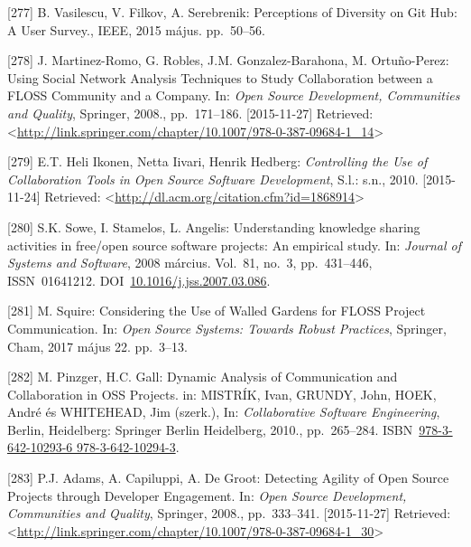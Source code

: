 \documentclass[12pt,magyar,a4paper,oneside]{scrreprt}
\begin{document}
\leavevmode\hypertarget{ref-vasilescu_perceptions_2015}{}%
{[}277{]} B. Vasilescu, V. Filkov, A. Serebrenik: Perceptions of
Diversity on Git Hub: A User Survey., IEEE, 2015 május. pp.~50--56.

\leavevmode\hypertarget{ref-martinez-romo_using_2008}{}%
{[}278{]} J. Martinez-Romo, G. Robles, J.M. Gonzalez-Barahona, M.
Ortuño-Perez: Using Social Network Analysis Techniques to Study
Collaboration between a FLOSS Community and a Company. In: \emph{Open
Source Development, Communities and Quality}, Springer, 2008.,
pp.~171--186. {[}2015-11-27{]} Retrieved:
\textless{}\url{http://link.springer.com/chapter/10.1007/978-0-387-09684-1_14}\textgreater{}

\leavevmode\hypertarget{ref-heli_ikonen_controlling_2010}{}%
{[}279{]} E.T. Heli Ikonen, Netta Iivari, Henrik Hedberg:
\emph{Controlling the Use of Collaboration Tools in Open Source Software
Development}, S.l.: s.n., 2010. {[}2015-11-24{]} Retrieved:
\textless{}\url{http://dl.acm.org/citation.cfm?id=1868914}\textgreater{}

\leavevmode\hypertarget{ref-sowe_understanding_2008}{}%
{[}280{]} S.K. Sowe, I. Stamelos, L. Angelis: Understanding knowledge
sharing activities in free/open source software projects: An empirical
study. In: \emph{Journal of Systems and Software}, 2008 március.
Vol.~81, no.~3, pp.~431--446, ISSN~01641212.
DOI~\href{https://doi.org/10.1016/j.jss.2007.03.086}{10.1016/j.jss.2007.03.086}.

\leavevmode\hypertarget{ref-squire_considering_2017}{}%
{[}281{]} M. Squire: Considering the Use of Walled Gardens for FLOSS
Project Communication. In: \emph{Open Source Systems: Towards Robust
Practices}, Springer, Cham, 2017 május 22. pp.~3--13.

\leavevmode\hypertarget{ref-mistrik_dynamic_2010}{}%
{[}282{]} M. Pinzger, H.C. Gall: Dynamic Analysis of Communication and
Collaboration in OSS Projects. in: MISTRÍK, Ivan, GRUNDY, John, HOEK,
André és WHITEHEAD, Jim (szerk.), In: \emph{Collaborative Software
Engineering}, Berlin, Heidelberg: Springer Berlin Heidelberg, 2010.,
pp.~265--284.
ISBN~\href{https://worldcat.org/isbn/978-3-642-10293-6\%20978-3-642-10294-3}{978-3-642-10293-6 978-3-642-10294-3}.

\leavevmode\hypertarget{ref-adams_detecting_2008}{}%
{[}283{]} P.J. Adams, A. Capiluppi, A. De Groot: Detecting Agility of
Open Source Projects through Developer Engagement. In: \emph{Open Source
Development, Communities and Quality}, Springer, 2008., pp.~333--341.
{[}2015-11-27{]} Retrieved:
\textless{}\url{http://link.springer.com/chapter/10.1007/978-0-387-09684-1_30}\textgreater{}
\end{document}
